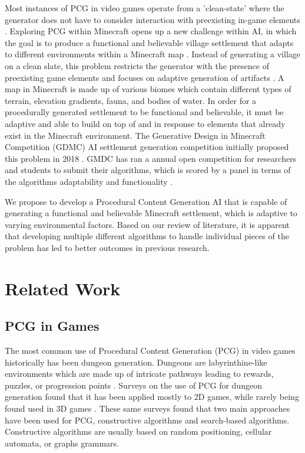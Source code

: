 \documentclass[11pt, oneside]{article}
\begin{document}
\begin{normalsize}
Most instances of PCG in video games operate from a 'clean-state' where the generator does not have to consider interaction with preexisting in-game elements \cite{green_organic_2019}. Exploring PCG within Minecraft opens up a new challenge within AI, in which the goal is to produce a functional and believable village settlement that adapts to different environments within a Minecraft map \cite{salge_generative_2019}. Instead of generating a village on a clean slate, this problem restricts the generator with the presence of preexisting game elements and focuses on adaptive generation of artifacts \cite{green_organic_2019}. A map in Minecraft is made up of various biomes which contain different types of terrain, elevation gradients, fauna, and bodies of water. In order for a procedurally generated settlement to be functional and believable, it must be adaptive and able to build on top of and in response to elements that already exist in the Minecraft environment. The Generative Design in Minecraft Competition (GDMC) AI settlement generation competition initially proposed this problem in 2018 \cite{salge_generative_2018}. GMDC has ran a annual open competition for researchers and students to submit their algorithms, which is scored by a panel in terms of the algorithms adaptability and functionality \cite{fridh_settlement_nodate}. 

We propose to develop a Procedural Content Generation AI that is capable of generating a functional and believable Minecraft settlement, which is adaptive to varying environmental factors. Based on our review of literature, it is apparent that developing multiple different algorithms to handle individual pieces of the problem has led to better outcomes in previous research. 

\newpage

\section{Related Work}
\label{Related Work}

\subsection{PCG in Games}

The most common use of Procedural Content Generation (PCG) in video games historically has been dungeon generation. Dungeons are labyrinthine-like environments which are made up of intricate pathways leading to rewards, puzzles, or progression points \cite{van2013procedural}. Surveys on the use of PCG for dungeon generation found that it has been applied mostly to 2D games, while rarely being found used in 3D games \cite{viana2019survey}. These same surveys found that two main approaches have been used for PCG, constructive algorithms and search-based algorithms. Constructive algorithms are usually based on random positioning, cellular automata, or graphs grammars. 


\end{normalsize}
\end{document}
